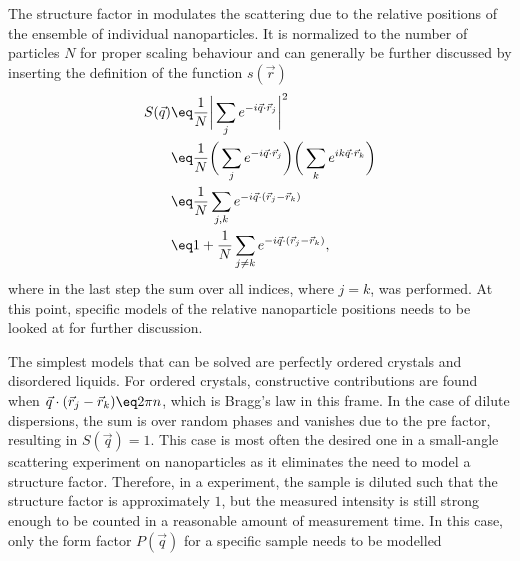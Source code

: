\documentclass[\main/dresen_thesis.tex]{subfiles}
\begin{document}
The structure factor in  modulates the scattering due to the relative positions of the ensemble of individual nanoparticles.
It is normalized to the number of particles $N$ for proper scaling behaviour and can generally be further discussed by inserting the definition of the function $s(\vec{r})$
\begin{align}
  S(\vec{q}) &\eq \frac{1}{N} \bigg| \sum_j  e^{-i\vec{q} \cdot \vec{r}_j} \bigg|^2\\
  &\eq \frac{1}{N}  \bigg( \sum_j  e^{-i\vec{q} \cdot \vec{r}_j} \bigg) \bigg( \sum_k  e^{i k\vec{q} \cdot \vec{r}_k} \bigg)\\
  &\eq \frac{1}{N}  \sum_{j, k}  e^{-i\vec{q} \cdot (\vec{r}_j - \vec{r}_k) }\\
  &\eq 1 + \frac{1}{N}  \sum_{j \neq k}  e^{-i\vec{q} \cdot (\vec{r}_j - \vec{r}_k)},\label{eq:theoreticalBackground:scattering:scatteringTheory:structureFactor}
\end{align}
where in the last step the sum over all indices, where $j=k$, was performed.
At this point, specific models of the relative nanoparticle positions needs to be looked at for further discussion.

The simplest models that can be solved are perfectly ordered crystals and disordered liquids.
For ordered crystals, constructive contributions are found when $\vec{q} \cdot (\vec{r}_j - \vec{r}_k) \eq 2 \pi n$, which is Bragg's law in this frame.
In the case of dilute dispersions, the sum is over random phases and vanishes due to the pre factor, resulting in $S(\vec{q}) = 1$.
This case is most often the desired one in a small-angle scattering experiment on nanoparticles as it eliminates the need to model a structure factor.
Therefore, in a experiment, the sample is diluted such that the structure factor is approximately $1$, but the measured intensity is still strong enough to be counted in a reasonable amount of measurement time.
In this case, only the form factor $P(\vec{q})$ for a specific sample needs to be modelled
\end{document}
